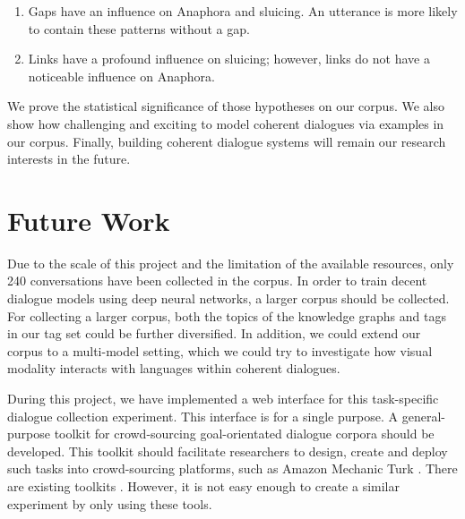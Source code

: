 \documentclass[bsc,frontabs,twoside,singlespacing,parskip,deptreport]{infthesis}     %
\begin{document}
\begin{enumerate}
   \item Gaps have an influence on Anaphora and sluicing. An utterance is more likely to contain these patterns without a gap.

   \item Links have a profound influence on sluicing; however, links do not have a noticeable influence on Anaphora.
\end{enumerate}

We prove the statistical significance of those hypotheses on our corpus. We also show how challenging and exciting to model coherent dialogues via examples in our corpus. Finally, building coherent dialogue systems will remain our research interests in the future.

\section{Future Work}

Due to the scale of this project and the limitation of the available resources, only 240 conversations have been collected in the corpus. In order to train decent dialogue models using deep neural networks, a larger corpus should be collected. For collecting a larger corpus, both the topics of the knowledge graphs and tags in our tag set could be further diversified. In addition, we could extend our corpus to a multi-model setting, which we could try to investigate how visual modality interacts with languages within coherent dialogues.

During this project, we have implemented a web interface for this task-specific dialogue collection experiment. This interface is for a single purpose. A general-purpose toolkit for crowd-sourcing goal-orientated dialogue corpora should be developed. This toolkit should facilitate researchers to design, create and deploy such tasks into crowd-sourcing platforms, such as Amazon Mechanic Turk \cite{mturk}. There are existing toolkits \cite{lee2018dialcrowd,miller2017parlai}. However, it is not easy enough to create a similar experiment by only using these tools.
\end{document}
